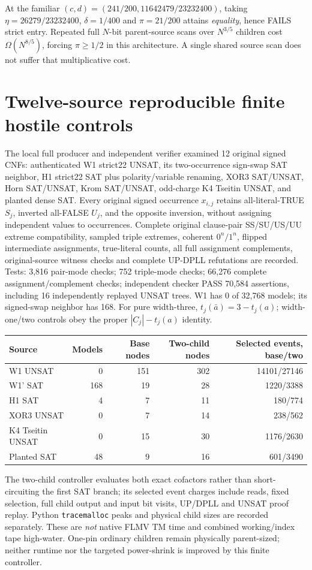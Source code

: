 \documentclass[10pt]{article}
\begin{document}
At the familiar $(c,d)=(241/200,11642479/23232400)$, taking $\eta=26279/23232400$, $\delta=1/400$ and $\pi=21/200$ attains \emph{equality}, hence FAILS strict entry. Repeated full $N$-bit parent-source scans over $N^{3/5}$ children cost $\Omega(N^{8/5})$, forcing $\pi\ge1/2$ in this architecture. A single shared source scan does not suffer that multiplicative cost.
\section{Twelve-source reproducible finite hostile controls}
The local full producer and independent verifier examined 12 original signed CNFs: authenticated W1 strict22 UNSAT, its two-occurrence sign-swap SAT neighbor, H1 strict22 SAT plus polarity/variable renaming, XOR3 SAT/UNSAT, Horn SAT/UNSAT, Krom SAT/UNSAT, odd-charge K4 Tseitin UNSAT, and planted dense SAT. Every original signed occurrence $x_{i,j}$ retains all-literal-TRUE $S_j$, inverted all-FALSE $U_j$, and the opposite inversion, without assigning independent values to occurrences. Complete original clause-pair SS/SU/US/UU extreme compatibility, sampled triple extremes, coherent $0^n/1^n$, flipped intermediate assignments, true-literal counts, all full assignment complements, original-source witness checks and complete UP-DPLL refutations are recorded. Tests: 3,816 pair-mode checks; 752 triple-mode checks; 66,276 complete assignment/complement checks; independent checker PASS 70,584 assertions, including 16 independently replayed UNSAT trees. W1 has 0 of 32,768 models; its signed-swap neighbor has 168. For pure width-three, $t_j(\bar a)=3-t_j(a)$; width-one/two controls obey the proper $|C_j|-t_j(a)$ identity.
\begin{center}\begin{tabular}{lrrrr}\toprule
Source&Models&Base nodes&Two-child nodes&Selected events, base/two\\\midrule
W1 UNSAT&0&151&302&14101/27146\\
W1' SAT&168&19&28&1220/3388\\
H1 SAT&4&7&11&180/774\\
XOR3 UNSAT&0&7&14&238/562\\
K4 Tseitin UNSAT&0&15&30&1176/2630\\
Planted SAT&48&9&16&601/3490\\\bottomrule\end{tabular}\end{center}
The two-child controller evaluates both exact cofactors rather than short-circuiting the first SAT branch; its selected event charges include reads, fixed selection, full child output and input bit visits, UP/DPLL and UNSAT proof replay. Python \texttt{tracemalloc} peaks and physical child sizes are recorded separately. These are \emph{not} native FLMV TM time and combined working/index tape high-water. One-pin ordinary children remain physically parent-sized; neither runtime nor the targeted power-shrink is improved by this finite controller.
\end{document}
